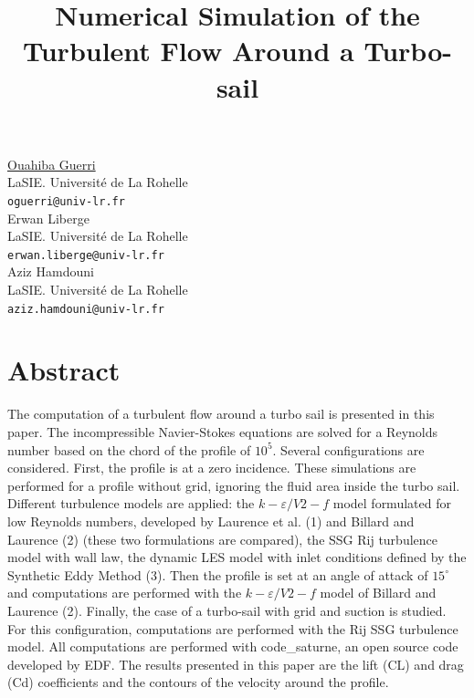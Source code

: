 \documentclass[article,A4,11pt]{llncs}%
\begin{document}
\title{Numerical Simulation of the Turbulent Flow Around a Turbo-sail}
 \author{} \institute{}
\maketitle
\begin{center}
{\large \underline{Ouahiba Guerri}}\\
LaSIE. Université de La Rohelle\\
{\tt oguerri@univ-lr.fr}
\\ \vspace{4mm}
{\large Erwan Liberge}\\
LaSIE. Université de La Rohelle\\
{\tt erwan.liberge@univ-lr.fr}
\\ \vspace{4mm}
{\large Aziz Hamdouni}\\
LaSIE. Université de La Rohelle\\
{\tt aziz.hamdouni@univ-lr.fr}
\end{center}

\section*{Abstract}
The computation of a turbulent flow around a turbo sail is presented in this paper.  The incompressible Navier-Stokes equations are solved for a Reynolds number based on the chord of the profile of $10^5$.
Several configurations are considered. First, the profile is at a zero incidence. These simulations are performed for a profile without grid, ignoring the fluid area inside the turbo sail. Different turbulence models are applied: 
the $k-\varepsilon/V2-f$ model formulated for low Reynolds numbers, developed by Laurence et al. (1) and Billard and Laurence (2) (these two formulations are compared), 
the SSG Rij turbulence model with wall law,
the dynamic LES model with inlet conditions defined by the Synthetic Eddy Method (3).
Then the profile is set at an angle of attack of $15^\circ$ and computations are performed with the $k-\varepsilon/V2-f$ model of Billard and Laurence (2). Finally, the case of a turbo-sail with grid and suction is studied. For this configuration, computations are performed with the Rij SSG turbulence model.
All computations are performed with code\_saturne, an open source code developed by EDF. The results presented in this paper are the lift (CL) and drag (Cd) coefficients and the contours of the velocity around the profile. 
\end{document}

